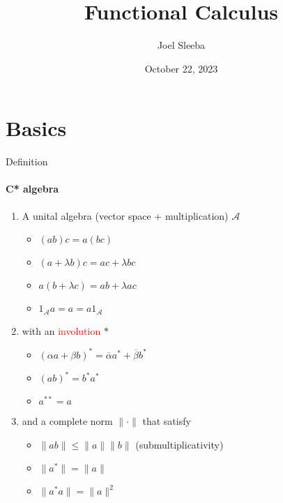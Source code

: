 \documentclass[handout, dvipsnames]{beamer}
\newcommand{\1}{\mathds{1}}	%
\begin{document}

\title{\color{titleText}Functional Calculus}
\author{Joel Sleeba\vspace{-.3cm}}
\date{\small October 22, 2023}

\begin{frame}
\titlepage
\vspace{-1.2cm}
\begin{center}
\end{center}
\end{frame}

\section{Basics}

\begin{frame}{Definition}
\framesubtitle{C* algebra}
\begin{enumerate}
  \item A unital algebra (vector space + multiplication) $\mathcal{A}$
    \begin{itemize}
      \item $(ab)c = a(bc)$
      \item $(a+ \lambda b)c = ac + \lambda bc$
      \item $a(b+ \lambda c) = ab + \lambda ac$
      \item $1_\mathcal{A} a = a = a1_\mathcal{A}$
    \end{itemize}
    \pause
  \item with an \textcolor{red}{involution} $*$
    \begin{itemize}
      \item $(\alpha a+\beta b)^* = \overline{\alpha}a^* + \overline{\beta}b^*$
      \item $(ab)^* = b^*a^*$
      \item $a^{**} = a$
    \end{itemize}
    \pause
  \item and a complete norm $\|\cdot \|$ that satisfy
    \begin{itemize}
      \item $\|ab\| \le \|a\| \|b\|$ (submultiplicativity)
      \item $\|a^*\| = \|a\|$
      \item $\|a^*a\| = \|a\|^2$
    \end{itemize}
\end{enumerate}
\end{frame}
\end{document}
